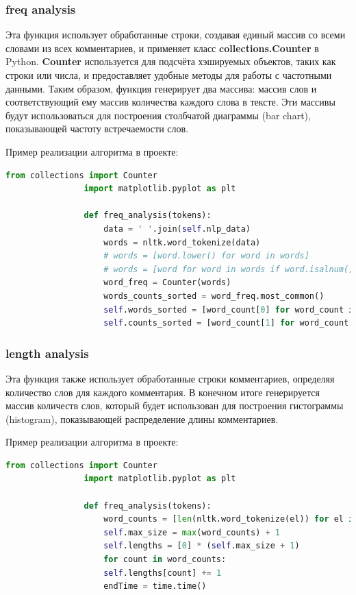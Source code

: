 		\subsubsection{freq analysis}
			Эта функция использует обработанные строки, создавая единый массив со всеми словами из всех комментариев, и применяет класс \textbf{collections.Counter} в Python. \textbf{Counter} используется для подсчёта хэшируемых объектов, таких как строки или числа, и предоставляет удобные методы для работы с частотными данными. Таким образом, функция генерирует два массива: массив слов и соответствующий ему массив количества каждого слова в тексте. Эти массивы будут использоваться для построения столбчатой диаграммы (bar chart), показывающей частоту встречаемости слов.
			
			Пример реализации алгоритма в проекте:
			\begin{lstlisting}[language=Python]
				from collections import Counter
				import matplotlib.pyplot as plt

				def freq_analysis(tokens):
					data = ' '.join(self.nlp_data)
					words = nltk.word_tokenize(data)
					# words = [word.lower() for word in words]
					# words = [word for word in words if word.isalnum()]
					word_freq = Counter(words)
					words_counts_sorted = word_freq.most_common()
					self.words_sorted = [word_count[0] for word_count in words_counts_sorted]
					self.counts_sorted = [word_count[1] for word_count in words_counts_sorted]
			\end{lstlisting}
		
		\subsubsection{length analysis}
			Эта функция также использует обработанные строки комментариев, определяя количество слов для каждого комментария. В конечном итоге генерируется массив количеств слов, который будет использован для построения гистограммы (histogram), показывающей распределение длины комментариев.
			
			Пример реализации алгоритма в проекте:
			\begin{lstlisting}[language=Python]
				from collections import Counter
				import matplotlib.pyplot as plt
				
				def freq_analysis(tokens):
					word_counts = [len(nltk.word_tokenize(el)) for el in self.nlp_data]
					self.max_size = max(word_counts) + 1
					self.lengths = [0] * (self.max_size + 1)
					for count in word_counts:
					self.lengths[count] += 1
					endTime = time.time()
			\end{lstlisting}
	
